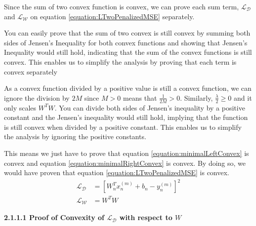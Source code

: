 \documentclass[a4paper,12pt]{article}
\begin{document}
Since the sum of two convex function is convex, we can prove each sum term, $\mathcal{L_D}$ and $\mathcal{L_W}$ on equation \ref{equation:LTwoPenalizedMSE} separately. 

You can easily prove that the sum of two convex is still convex by summing both sides of Jensen's Inequality for both convex functions and showing that Jensen's Inequality would still hold, indicating that the sum of the convex functions is still convex. This enables us to simplify the analysis by proving that each term is convex separately 

As a convex function divided by a positive value is still a convex function, we can ignore the division by $2M$ since $M > 0$ means that $\frac{1}{2M} > 0$. Similarly, $\frac{\lambda}{2} \geq 0$ and it only scales $W^{T}W$. You can divide both sides of Jensen's inequality by a positive constant and the Jensen's inequality would still hold, implying that the function is still convex when divided by a positive constant. This enables us to simplify the analysis by ignoring the positive constants. 

This means we just have to prove that equation \ref{equation:minimalLeftConvex} is convex and equation \ref{equation:minimalRightConvex} is convex. By doing so, we would have proven that equation \ref{equation:LTwoPenalizedMSE} is convex. 
\begin{align}
\label{equation:minimalLeftConvex} \mathcal{L_D} &= \left[W^{T}_{n}x^{(m)}_{n} + b_{n} - y^{(m)}_{n}\right]^{2} \\
\label{equation:minimalRightConvex} \mathcal{L_W} &= W^{T} W
\end{align}

\textbf{2.1.1.1 Proof of Convexity of $\mathcal{L_D}$ with respect to $W$}
\end{document}
